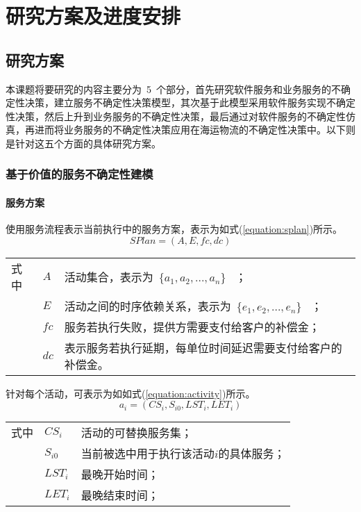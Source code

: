 \section{研究方案及进度安排}

\subsection{研究方案}

本课题将要研究的内容主要分为~5~个部分，首先研究软件服务和业务服务的不确定性决策，建立服务不确定性决策模型，其次基于此模型采用软件服务实现不确定性决策，然后上升到业务服务的不确定性决策，最后通过对软件服务的不确定性仿真，再进而将业务服务的不确定性决策应用在海运物流的不确定性决策中。以下则是针对这五个方面的具体研究方案。

\subsubsection{基于价值的服务不确定性建模}
\setcounter{paragraph}{0}
\paragraph{服务方案}

使用服务流程表示当前执行中的服务方案，表示为如式(\ref{equation:splan})所示。
\begin{equation}\label{equation:splan}
SPlan = \left( {A,E,fc,dc} \right)
\end{equation}
\begin{tabularx}{\textwidth}{@{}l@{\quad}l@{\pozhehao }X@{}}
    式中
    & ${A}$ & 活动集合，表示为~$\{{a_1}, {a_2},...,{a_n}\}$ ~； \\
    & ${E}$ & 活动之间的时序依赖关系，表示为~$\{{e_1}, {e_2},...,{e_n}\}$ ~；\\
    & ${fc}$ & 服务若执行失败，提供方需要支付给客户的补偿金；\\
    & ${dc}$ & 表示服务若执行延期，每单位时间延迟需要支付给客户的补偿金。
\end{tabularx}\vspace{\wordsep}

针对每个活动，可表示为如如式(\ref{equation:activity})所示。
\begin{equation}\label{equation:activity}
{a_i} = ({CS_i}, {S_{i0}}, {LST_i}, {LET_i})
\end{equation}
\begin{tabularx}{\textwidth}{@{}l@{\quad}l@{\pozhehao }X@{}}
    式中
    & ${CS_i}$ & 活动的可替换服务集；\\
    & ${S_{i0}}$ & 当前被选中用于执行该活动$i$的具体服务；\\
    & ${LST_i}$ & 最晚开始时间；\\
    & ${LET_i}$ & 最晚结束时间；
\end{tabularx}\vspace{\wordsep}

